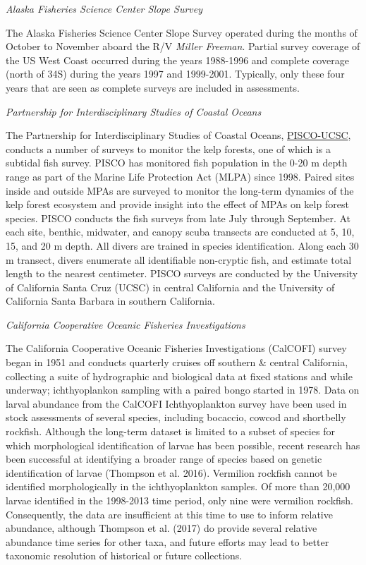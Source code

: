 \documentclass[
  english,
  a4paper,
]{article}
\begin{document}
\emph{Alaska Fisheries Science Center Slope Survey}

The Alaska Fisheries Science Center Slope Survey operated during the months of October to November aboard the
R/V \emph{Miller Freeman}.
Partial survey coverage of the US West Coast occurred during the years 1988-1996
and complete coverage (north of 34\textquotesingle S) during the
years 1997 and 1999-2001.
Typically, only these four years that are seen as complete surveys are included
in assessments.

\emph{Partnership for Interdisciplinary Studies of Coastal Oceans}

The Partnership for Interdisciplinary Studies of Coastal Oceans,
\href{http://www.piscoweb.org/kelp-forest-study}{PISCO-UCSC}, conducts a number of surveys
to monitor the kelp forests, one of which is a subtidal fish survey. PISCO
has monitored fish population in the 0-20 m depth range as part of the
Marine Life Protection Act (MLPA) since 1998. Paired sites inside and outside MPAs
are surveyed to monitor the long-term dynamics of the kelp forest ecosystem and provide
insight into the effect of MPAs on kelp forest species. PISCO conducts the fish
surveys from late July through September. At each site, benthic, midwater, and canopy
scuba transects are conducted at 5, 10, 15, and 20 m depth. All divers are trained
in species identification. Along each 30 m transect, divers enumerate all identifiable
non-cryptic fish, and estimate total length to the nearest centimeter. PISCO surveys
are conducted by the University of California Santa Cruz (UCSC) in central California and the University of California Santa Barbara in southern California.

\emph{California Cooperative Oceanic Fisheries Investigations}

The California Cooperative Oceanic Fisheries Investigations (CalCOFI) survey began in 1951 and conducts quarterly cruises off southern \& central California, collecting a suite of hydrographic and biological data at fixed stations and while underway; ichthyoplankon sampling with a paired bongo started in 1978.
Data on larval abundance from the CalCOFI Ichthyoplankton survey have been used in
stock assessments of several species, including bocaccio, cowcod and shortbelly
rockfish. Although the long-term dataset is limited to a subset of species
for which morphological identification of larvae has been possible, recent research
has been successful at identifying a broader range of species based on genetic
identification of larvae (Thompson et al. 2016).
Vermilion rockfish cannot be identified morphologically in the ichthyoplankton
samples. Of more than 20,000 larvae identified in the 1998-2013 time period, only nine
were vermilion rockfish. Consequently,
the data are insufficient at this time to use to inform relative abundance, although Thompson et al. (2017) do provide several relative abundance time series for other taxa, and
future efforts may lead to better taxonomic resolution of historical or future collections.
\end{document}
